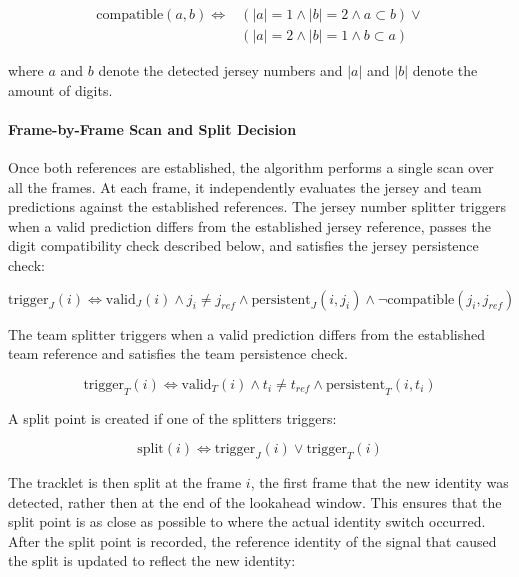 \begin{equation}
    \begin{split}
    \text{compatible}(a,b) \iff &
    (|a| =1 \land |b|=2 \land a \subset b) 
    \lor \\
    & (|a| =2 \land |b|=1 \land b \subset a)
    \end{split}
\end{equation}


where $a$ and $b$ denote the detected jersey numbers and $|a|$ and $|b|$ denote the amount of digits. 


\paragraph{Frame-by-Frame Scan and Split Decision}
Once both references are established, the algorithm performs a single scan over all the frames. At each frame, it independently evaluates the jersey and team predictions against the established references. The jersey number splitter triggers when a valid prediction differs from the established jersey reference, passes the digit compatibility check described below, and satisfies the jersey persistence check:

\begin{equation}
    \text{trigger}_J(i) \iff \text{valid}_J(i)  \land j_i \neq j_{ref} \land \text{persistent}_J(i, j_i) \land \neg \text{compatible}(j_i,j_{ref}) 
\end{equation}

The team splitter triggers when a valid prediction differs from the established team reference and satisfies the team persistence check.

\begin{equation}
    \text{trigger}_T(i) \iff \text{valid}_T(i)  \land t_i \neq t_{ref} \land \text{persistent}_T(i, t_i)
\end{equation}

A split point is created if one of the splitters triggers:

\begin{equation}
    \text{split}(i) \iff \text{trigger}_J(i) \lor \text{trigger}_T(i)
\end{equation}

The tracklet is then split at the frame $i$, the first frame that the new identity was detected, rather then at the end of the lookahead window. This ensures that the split point is as close as possible to where the actual identity switch occurred. After the split point is recorded, the reference identity of the signal that caused the split is updated to reflect the new identity:

